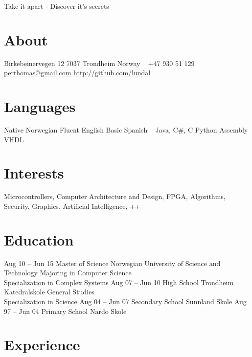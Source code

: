 \documentclass[print]{friggeri-cv}
\begin{document}
       {Take it apart - Discover it's secrets}


\begin{aside}
    \section{About}
        Birkebeinervegen 12
        7037 Trondheim
        Norway
        ~
        +47 930 51 129
        ~
        \href{mailto:perthomas@gmail.com}{perthomas@gmail.com}
        \href{http://github.com/lundal}{http://github.com/lundal}
    \section{Languages}
        Native Norwegian
        Fluent English
        Basic Spanish
        ~
        Java, C\#, C
        Python
        Assembly
        VHDL
\end{aside}

\section{Interests}

Microcontrollers,
Computer Architecture and Design,
FPGA,
Algorithms,
Security,
Graphics,
Artificial Intelligence,
++

\section{Education}

\begin{entrylist}
    \entry
        {Aug 10 – Jun 15}
        {Master of Science}
        {Norwegian University of Science and Technology}
        {Majoring in Computer Science\\
        Specialization in Complex Systems}
    \entry
        {Aug 07 – Jun 10}
        {High School}
        {Trondheim Katedralskole}
        {General Studies\\
        Specialization in Science}
    \entry
        {Aug 04 – Jun 07}
        {Secondary School}
        {Sunnland Skole}
        {}
    \entry
        {Aug 97 – Jun 04}
        {Primary School}
        {Nardo Skole}
        {}
\end{entrylist}

\section{Experience}
\end{document}
